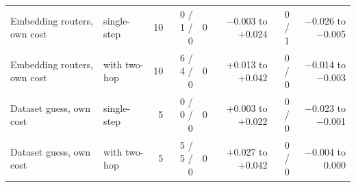 \begin{table}[t]
\begin{tabular*}{\linewidth}{@{\extracolsep{\fill}}llrrrrrr}
Embedding routers, own cost & single-step & 10 & 0 / 1 / 0 & 0 & $-$0.003 to +0.024 & 0 / 1 & $-$0.026 to $-$0.005 \\
Embedding routers, own cost & with two-hop & 10 & 6 / 4 / 0 & 0 & +0.013 to +0.042 & 0 / 0 & $-$0.014 to $-$0.003 \\
Dataset guess, own cost & single-step & 5 & 0 / 0 / 0 & 0 & +0.003 to +0.022 & 0 / 0 & $-$0.023 to $-$0.001 \\
Dataset guess, own cost & with two-hop & 5 & 5 / 5 / 0 & 0 & +0.027 to +0.042 & 0 / 0 & $-$0.004 to 0.000 \\
\bottomrule
\end{tabular*}
\end{table}
